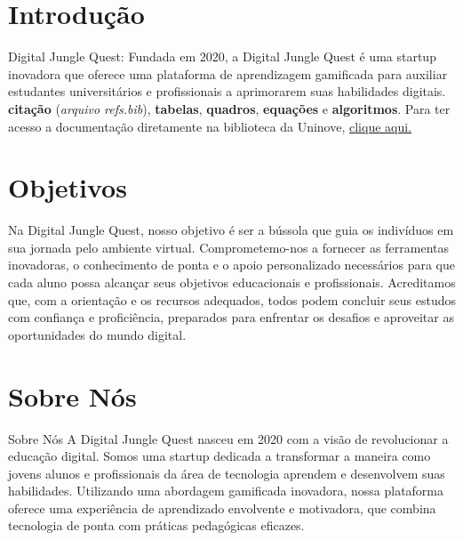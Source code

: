 \renewcommand{\thefigure}{\arabic{figure}}

\chapter{Introdução}
\label{ch:introducao}
\begin{resumocapitulo}
Digital Jungle Quest:
Fundada em 2020, a Digital Jungle Quest é uma startup inovadora que oferece uma plataforma de aprendizagem gamificada para auxiliar estudantes universitários e profissionais a aprimorarem suas habilidades digitais.
 \textbf{citação} (\textit{arquivo refs.bib}), \textbf{tabelas}, \textbf{quadros}, \textbf{equações} e \textbf{algoritmos}. Para ter acesso a documentação diretamente na biblioteca da Uninove, \href{http://docs.uninove.br/arte/pdfs/Manual_de_Trabalhos_Academicos_ABNT_UNINOVE.pdf}{clique aqui.}
\end{resumocapitulo}

\chapter{Objetivos}
\label{ch:Objetivos}
Na Digital Jungle Quest, nosso objetivo é ser a bússola que guia os indivíduos em sua jornada pelo ambiente virtual. Comprometemo-nos a fornecer as ferramentas inovadoras, o conhecimento de ponta e o apoio personalizado necessários para que cada aluno possa alcançar seus objetivos educacionais e profissionais. Acreditamos que, com a orientação e os recursos adequados, todos podem concluir seus estudos com confiança e proficiência, preparados para enfrentar os desafios e aproveitar as oportunidades do mundo digital.

\chapter{Sobre Nós}
\label{ch:Sobre Nos}
Sobre Nós
A Digital Jungle Quest nasceu em 2020 com a visão de revolucionar a educação digital. Somos uma startup dedicada a transformar a maneira como jovens alunos e profissionais da área de tecnologia aprendem e desenvolvem suas habilidades. Utilizando uma abordagem gamificada inovadora, nossa plataforma oferece uma experiência de aprendizado envolvente e motivadora, que combina tecnologia de ponta com práticas pedagógicas eficazes.

